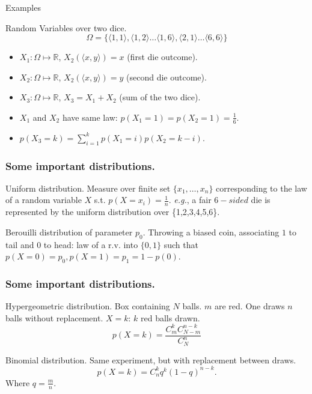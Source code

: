 \documentclass{beamer}
\begin{document}
\begin{frame}{Examples}
  \begin{exampleblock}{Random Variables over two dice.}
    \[\Omega = \{\langle 1,1 \rangle, \langle 1,2 \rangle \dots \langle 1,6 \rangle, \langle 2,1 \rangle \dots \langle 6,6 \rangle\}\]
    \begin{itemize}
    \item $X_1: \Omega \mapsto \mathbb{R}$, $X_2(\langle x,y \rangle) = x$ (first die outcome).
    \item $X_2: \Omega \mapsto \mathbb{R}$, $X_2(\langle x,y \rangle) = y$ (second die outcome).
    \item $X_3: \Omega \mapsto \mathbb{R}$, $X_3 = X_1 + X_2$ (sum of the two dice).
    \end{itemize}
  \end{exampleblock}

  \begin{itemize}
  \item $X_1$ and $X_2$ have same law: $p(X_1 = 1) = p(X_2 = 1) = \frac{1}{6}$.
  \item $p(X_3 = k) = \sum^{k}_{i=1} p(X_1 = i)p(X_2 = k - i)$. 
  \end{itemize}  
\end{frame}

\begin{frame}
  \frametitle{Some important distributions.}

  \begin{exampleblock}{Uniform distribution.}
    Measure over finite set $\{x_1, \dots, x_n\}$ corresponding to the law of a random variable $X$ s.t. $p(X = x_i) = \frac{1}{n}$. \emph{e.g.}, a fair $6-sided$ die is represented by the uniform distribution over \{1,2,3,4,5,6\}.
  \end{exampleblock}

  \begin{exampleblock}{Berouilli distribution of parameter $p_0$.}
    Throwing a biased coin, associating $1$ to tail and $0$ to head: law of a r.v. into $\{0, 1\}$ such that $p(X = 0) = p_0, p(X = 1) = p_1 = 1 - p(0)$.
  \end{exampleblock}
\end{frame}

\begin{frame}
  \frametitle{Some important distributions.}
  \begin{exampleblock}{Hypergeometric distribution.}
    Box containing $N$ balls. $m$ are red. One draws $n$ balls without replacement. $X = k$: $k$ red balls drawn.
    \[
    p(X = k) = \frac{C^k_mC^{n-k}_{N-m}}{C^n_N}
    \]
  
  \end{exampleblock}

  \begin{exampleblock}{Binomial distribution.}
    Same experiment, but with replacement between draws.
    \[
    p(X = k) = C^k_nq^{k}(1 - q)^{n-k}.
    \]
    Where $q = \frac{m}{n}$.
  \end{exampleblock}
  
\end{frame}
\end{document}

